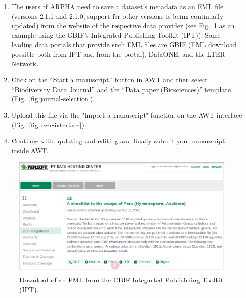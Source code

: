 \begin{enumerate}
\item{The users of ARPHA need to save a dataset's metadata as an EML file (versions 2.1.1 and 2.1.0, support for other versions is being continually updated) from the website of the respective data provider (see Fig.~\ref{fig:EML-download} as an example using the GBIF's Integrated Publishing Toolkit (IPT)). Some leading data portals that provide such EML files are GBIF (EML download possible both from IPT and from the portal), DataONE, and the LTER Network.}
\item{Click on the ``Start a manuscript'' button in AWT and then select ``Biodiversity Data Journal'' and the ``Data paper (Biosciences)'' template (Fig.~\ref{fig:journal-selection}).}
\item{Upload this file via the "Import a manuscript" function on the AWT interface (Fig.~\ref{fig:user-interface}).}
\item{Continue with updating and editing and finally submit your manuscript inside AWT.}
\end{enumerate}

\begin{figure}
\centering
\includegraphics[width=\textwidth]{Figures/EML-download}
\decoRule
\caption{Download of an EML from the GBIF Integarted Publishuing Toolkit (IPT).}
\label{fig:EML-download}
\end{figure}


